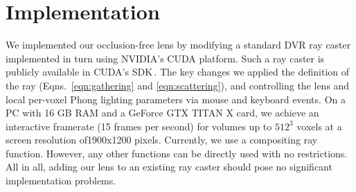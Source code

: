 \section{Implementation}
\label{sec:implem}
%
We implemented our occlusion-free lens by modifying a standard DVR ray caster implemented in turn using NVIDIA's CUDA platform. Such a ray caster is publicly available in CUDA's SDK\,\cite{cudasdk}. The key changes we applied the definition of the ray (Eqns.~\ref{eqn:gathering} and \ref{eqn:scattering}), and controlling the lens and local per-voxel Phong lighting parameters via mouse and keyboard events. On a PC with 16 GB RAM and a GeForce GTX TITAN X card, we achieve an interactive framerate (15 frames per second) for volumes up to $512^3$ voxels at a screen resolution of1900x1200 pixels. Currently, we use a compositing ray function. However, any other functions can be directly used with no restrictions. All in all, adding our lens to an existing ray caster should pose no significant implementation problems.

